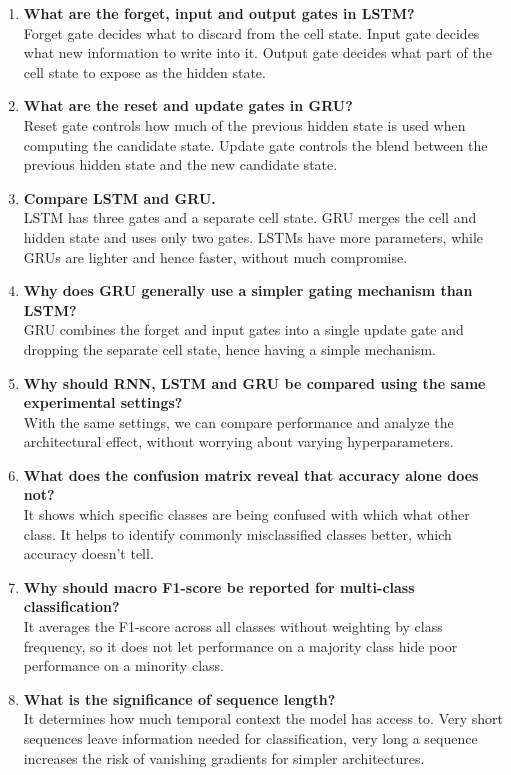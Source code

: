 \documentclass[10pt]{article}
\begin{document}
\begin{enumerate}
\item \textbf{What are the forget, input and output gates in LSTM?} \\Forget gate decides what to discard from the cell state. Input gate decides what new information to write into it. Output gate decides what part of the cell state to expose as the hidden state.
\item \textbf{What are the reset and update gates in GRU?} \\Reset gate controls how much of the previous hidden state is used when computing the candidate state. Update gate controls the blend between the previous hidden state and the new candidate state.
\item \textbf{Compare LSTM and GRU.} \\LSTM has three gates and a separate cell state. GRU merges the cell and hidden state and uses only two gates. LSTMs have more parameters, while GRUs are lighter and hence faster, without much compromise.
\item \textbf{Why does GRU generally use a simpler gating mechanism than LSTM?} \\GRU combines the forget and input gates into a single update gate and dropping the separate cell state, hence having a simple mechanism.
\item \textbf{Why should RNN, LSTM and GRU be compared using the same experimental settings?} \\ With the same settings, we can compare performance and analyze the architectural effect, without worrying about varying hyperparameters.
\item \textbf{What does the confusion matrix reveal that accuracy alone does not?} \\It shows which specific classes are being confused with which what other class. It helps to identify commonly misclassified classes better, which accuracy doesn't tell.
\item \textbf{Why should macro F1-score be reported for multi-class classification?} \\It averages the F1-score across all classes without weighting by class frequency, so it does not let performance on a majority class hide poor performance on a minority class.
\item \textbf{What is the significance of sequence length?} \\It determines how much temporal context the model has access to. Very short sequences leave information needed for classification, very long a sequence increases the risk of vanishing gradients for simpler architectures.

\end{enumerate}
\end{document}
